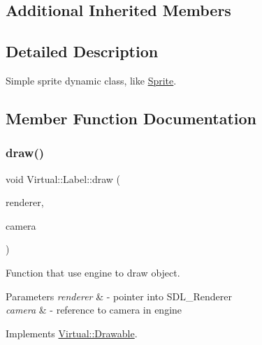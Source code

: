 \subsection*{Additional Inherited Members}


\subsection{Detailed Description}
Simple sprite dynamic class, like \hyperlink{class_virtual_1_1_sprite}{Sprite}. 

\subsection{Member Function Documentation}
\hypertarget{class_virtual_1_1_label_aaea754974570ba425d2b9ffe91d183c7}{}\label{class_virtual_1_1_label_aaea754974570ba425d2b9ffe91d183c7} 
\subsubsection{\texorpdfstring{draw()}{draw()}}
{\footnotesize\ttfamily void Virtual\+::\+Label\+::draw (\begin{DoxyParamCaption}\item[{S\+D\+L\+\_\+\+Renderer $\ast$}]{renderer,  }\item[{\hyperlink{class_virtual_1_1_camera}{Camera} \&}]{camera }\end{DoxyParamCaption})\hspace{0.3cm}{\ttfamily [virtual]}}



Function that use engine to draw object. 


\begin{DoxyParams}{Parameters}
{\em renderer} & -\/ pointer into S\+D\+L\+\_\+\+Renderer \\
\hline
{\em camera} & -\/ reference to camera in engine \\
\hline
\end{DoxyParams}


Implements \hyperlink{class_virtual_1_1_drawable_af7014800911efa59b96e538149e56f8b}{Virtual\+::\+Drawable}.

\hypertarget{class_virtual_1_1_label_adf4f738abab5dca3815a9c6f4124eec6}{}\label{class_virtual_1_1_label_adf4f738abab5dca3815a9c6f4124eec6} 
